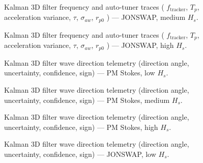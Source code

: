 \documentclass[11pt,letterpaper]{article}
\begin{document}
    \begin{figure}[H]\centering
    \resizebox{\textwidth}{!}{}
    \caption{Kalman 3D filter frequency and auto-tuner traces ( $f_{\mathrm{tracker}}$, $T_p$, acceleration variance, $\tau$, $\sigma_{aw}$, $r_{p0}$ ) — JONSWAP, medium $H_s$.}
    \label{fig:w3d_ou2_jonswap_medium_tuner}
    \end{figure}

    \begin{figure}[H]\centering
    \resizebox{\textwidth}{!}{}
    \caption{Kalman 3D filter frequency and auto-tuner traces ( $f_{\mathrm{tracker}}$, $T_p$, acceleration variance, $\tau$, $\sigma_{aw}$, $r_{p0}$ ) — JONSWAP, high $H_s$.}
    \label{fig:w3d_ou2_jonswap_high_tuner}
    \end{figure}



    \begin{figure}[H]\centering
    \resizebox{\textwidth}{!}{}
    \caption{Kalman 3D filter wave direction telemetry (direction angle, uncertainty, confidence, sign) — PM Stokes, low $H_s$.}
    \label{fig:w3d_ou2_pmstokes_low_dir}
    \end{figure}

    \begin{figure}[H]\centering
    \resizebox{\textwidth}{!}{}
    \caption{Kalman 3D filter wave direction telemetry (direction angle, uncertainty, confidence, sign) — PM Stokes, medium $H_s$.}
    \label{fig:w3d_ou2_pmstokes_medium_dir}
    \end{figure}

    \begin{figure}[H]\centering
    \resizebox{\textwidth}{!}{}
    \caption{Kalman 3D filter wave direction telemetry (direction angle, uncertainty, confidence, sign) — PM Stokes, high $H_s$.}
    \label{fig:w3d_ou2_pmstokes_high_dir}
    \end{figure}

    \begin{figure}[H]\centering
    \resizebox{\textwidth}{!}{}
    \caption{Kalman 3D filter wave direction telemetry (direction angle, uncertainty, confidence, sign) — JONSWAP, low $H_s$.}
    \label{fig:w3d_ou2_jonswap_low_dir}
    \end{figure}
\end{document}

